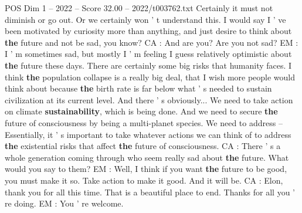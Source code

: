 \begin{textsample}{POS Dim 1 – 2022 – Score 32.00 – 2022/t003762.txt}
Certainly it must not diminish or go out.
Or we certainly won ' t understand this.
I would say I ' ve been motivated by curiosity more than anything, and just desire to think about \textbf{the} future and not be sad, you know?
CA : And are you?
Are you not sad?
EM : I ' m sometimes sad, but mostly I ' m feeling I guess relatively optimistic about \textbf{the} future these days.
There are certainly some big risks that humanity faces.
I think \textbf{the} population collapse is a really big deal, that I wish more people would think about because \textbf{the} birth rate is far below what ' s needed to sustain civilization at its current level.
And there ' s obviously...
We need to take action on climate \textbf{sustainability}, which is being done.
And we need to secure \textbf{the} future of consciousness by being a multi-planet species.
We need to address -- Essentially, it ' s important to take whatever actions we can think of to address \textbf{the} existential risks that affect \textbf{the} future of consciousness.
CA : There ' s a whole generation coming through who seem really sad about \textbf{the} future.
What would you say to them?
EM : Well, I think if you want \textbf{the} future to be good, you must make it so.
Take action to make it good.
And it will be.
CA : Elon, thank you for all this time.
That is a beautiful place to end.
Thanks for all you ' re doing.
EM : You ' re welcome.

\end{textsample}
